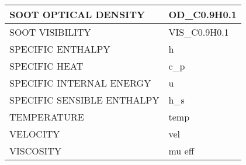 \begin{table}[bph]
\begin{center}
\begin{tabular}{|l|l|}
 SOOT OPTICAL DENSITY  &   OD\_C0.9H0.1 \\ \hline
 SOOT VISIBILITY  &   VIS\_C0.9H0.1 \\ \hline
 SPECIFIC ENTHALPY  &   h \\ \hline
 SPECIFIC HEAT  &   c\_p \\ \hline
 SPECIFIC INTERNAL ENERGY  &   u \\ \hline
 SPECIFIC SENSIBLE ENTHALPY  &   h\_s \\ \hline
 TEMPERATURE  &   temp \\ \hline
 VELOCITY  &   vel \\ \hline
 VISCOSITY  &   mu eff \\ \hline
\end{tabular}
\label{tabSLCF}
\end{center}
\end{table}
